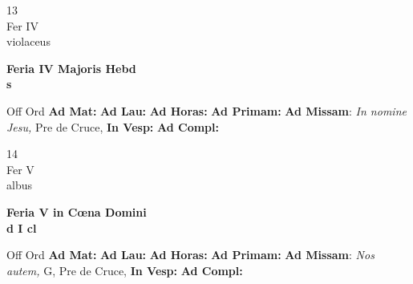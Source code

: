 \documentclass[10pt, openany]{book}
\begin{document}
        \begin{center}
            \begin{minipage}{3.5in}
                \vspace{2em}
                \begin{minipage}{0.5in}
                    {\Huge 13} \\
                    {\normalsize Fer IV} \\
                    {\normalsize violaceus}
                \end{minipage}
                \begin{minipage}{3.0in}
                    \textbf{ \large Feria IV Majoris Hebd \\
                    \textnormal{\normalsize s}} \\ 
                \end{minipage}
                \begin{justify}Off Ord
                    \textbf{Ad Mat: }
                    \textbf{Ad Lau: }
                    \textbf{Ad Horas: }
                    \textbf{Ad Primam: }\textbf{Ad Missam}: \textit{In nomine Jesu,} Pre de Cruce,  
                    \textbf{In Vesp: }
                    \textbf{Ad Compl: }
                \end{justify}
            \end{minipage}
        \end{center}
    
        \begin{center}
            \begin{minipage}{3.5in}
                \vspace{2em}
                \begin{minipage}{0.5in}
                    {\Huge 14} \\
                    {\normalsize Fer V} \\
                    {\normalsize albus}
                \end{minipage}
                \begin{minipage}{3.0in}
                    \textbf{ \large Feria V in Cœna Domini \\
                    \textnormal{\normalsize d I cl}} \\ 
                \end{minipage}
                \begin{justify}Off Ord
                    \textbf{Ad Mat: }
                    \textbf{Ad Lau: }
                    \textbf{Ad Horas: }
                    \textbf{Ad Primam: }\textbf{Ad Missam}: \textit{Nos autem,} G, Pre de Cruce,  
                    \textbf{In Vesp: }
                    \textbf{Ad Compl: }
                \end{justify}
            \end{minipage}
        \end{center}
    
\end{document}
